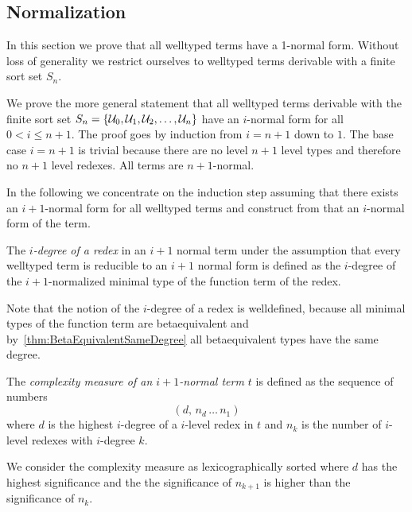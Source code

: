 \subsection{Normalization}

In this section we prove that all welltyped terms have a 1-normal form. Without
loss of generality we restrict ourselves to welltyped terms derivable with a
finite sort set $S_n$.

We prove the more general statement that all welltyped terms derivable with the
finite sort set $S_n = {\left\{{\cal U}_0, {\cal U}_1, {\cal U}_2, \ldots, {\cal U}_n\right\}}$ have an
$i$-normal form for all $0 < i \le n + 1$. The proof goes by induction from $i =
n+1$ down to $1$. The base case $i = n + 1$ is trivial because there are no
level $n+1$ level types and therefore no $n+1$ level redexes. All terms are
$n+1$-normal.

In the following we concentrate on the induction step assuming that there exists
an $i+1$-normal form for all welltyped terms and construct from that an
$i$-normal form of the term.

\begin{definition}
    The \emph{$i$-degree of a redex}
    in an $i+1$ normal term under the assumption
    that every welltyped term is reducible to an $i+1$ normal form is defined as
    the $i$-degree of the $i+1$-normalized minimal type of the function term of
    the redex.

    Note that the notion of the $i$-degree of a redex is welldefined, because
    all minimal types of the function term are betaequivalent and
    by~\ref{thm:BetaEquivalentSameDegree} all betaequivalent types have the same
    degree.
\end{definition}



\begin{definition}
    The \emph{complexity measure of an $i+1$-normal term $t$}
    is defined as the sequence of numbers
    $$
        (d,  \, n_d \, \ldots \, n_1)
    $$
    where $d$ is the highest $i$-degree of a $i$-level redex in $t$ and $n_k$ is the
    number of $i$-level redexes with $i$-degree $k$.

    We consider the complexity measure as lexicographically sorted where $d$ has
    the highest significance and the the significance of $n_{k+1}$ is higher
    than the significance of $n_k$.
\end{definition}


